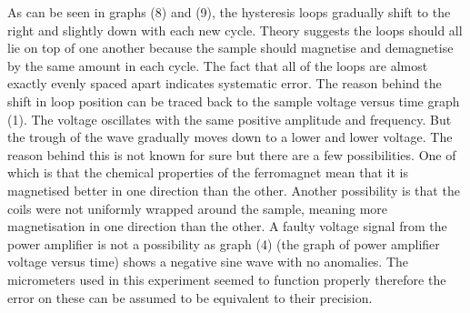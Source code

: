 \documentclass[a4paper]{article}\usepackage[english]{babel}
\begin{document}
As can be seen in graphs (8) and (9), the hysteresis loops gradually shift to the right and slightly down with each new cycle. Theory suggests the loops should all lie on top of one another because the sample should magnetise and demagnetise by the same amount in each cycle.  The fact that all of the loops are almost exactly evenly spaced apart indicates systematic error. The reason behind the shift in loop position can be traced back to the sample voltage versus time graph (1). The voltage oscillates with the same positive amplitude and frequency. But the trough of the wave gradually moves down to a lower and lower voltage. The reason behind this is not known for sure but there are a few possibilities. One of which is that the chemical properties of the ferromagnet mean that it is magnetised better in one direction than the other. Another possibility is that the coils were not uniformly wrapped around the sample, meaning more magnetisation in one direction than the other. A faulty voltage signal from the power amplifier is not a possibility as graph (4) (the graph of power amplifier voltage versus time) shows a negative sine wave with no anomalies.
The micrometers used in this experiment seemed to function properly therefore the error on these can be assumed to be equivalent to their precision.
\end{document}
